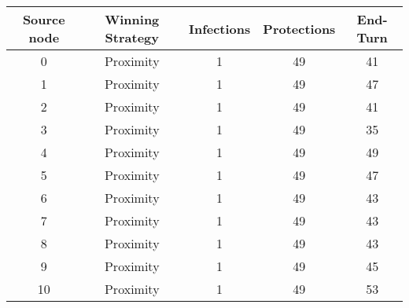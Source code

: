 \documentclass[results.tex]{subfiles}
\begin{document}
    \begin{center}
        \begin{tabular}{| c || c | c | c | c |}
            \hline
            {\bfseries Source node} & {\bfseries Winning Strategy} & {\bfseries Infections} & {\bfseries Protections}
            & {\bfseries End-Turn}
            \\  %
            \hline\hline
            0                       & Proximity                    & 1                      & 49                      & 41                   \\
            \hline
            1                       & Proximity                    & 1                      & 49                      & 47                   \\
            \hline
            2                       & Proximity                    & 1                      & 49                      & 41                   \\
            \hline
            3                       & Proximity                    & 1                      & 49                      & 35                   \\
            \hline
            4                       & Proximity                    & 1                      & 49                      & 49                   \\
            \hline
            5                       & Proximity                    & 1                      & 49                      & 47                   \\
            \hline
            6                       & Proximity                    & 1                      & 49                      & 43                   \\
            \hline
            7                       & Proximity                    & 1                      & 49                      & 43                   \\
            \hline
            8                       & Proximity                    & 1                      & 49                      & 43                   \\
            \hline
            9                       & Proximity                    & 1                      & 49                      & 45                   \\
            \hline
            10                      & Proximity                    & 1                      & 49                      & 53                   \\

\end{tabular}
\end{center}
\end{document}
